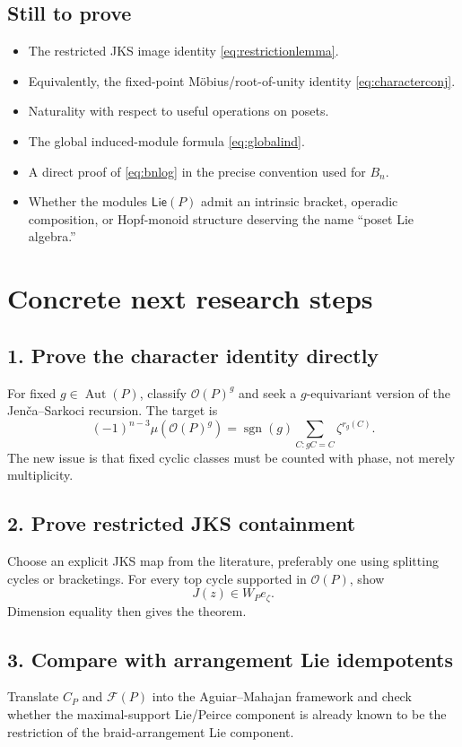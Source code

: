 \documentclass[11pt]{article}
\newcommand{\OP}{\mathcal O}
\newcommand{\Aut}{\operatorname{Aut}}
\newcommand{\sgn}{\operatorname{sgn}}
\begin{document}
\subsection*{Still to prove}
\begin{itemize}
\item The restricted JKS image identity \eqref{eq:restrictionlemma}.
\item Equivalently, the fixed-point M\"obius/root-of-unity identity
\eqref{eq:characterconj}.
\item Naturality with respect to useful operations on posets.
\item The global induced-module formula \eqref{eq:globalind}.
\item A direct proof of \eqref{eq:bnlog} in the precise convention used for
$B_n$.
\item Whether the modules $\mathsf{Lie}(P)$ admit an intrinsic bracket,
operadic composition, or Hopf-monoid structure deserving the name ``poset
Lie algebra.''
\end{itemize}

\section{Concrete next research steps}
\subsection{1. Prove the character identity directly}
For fixed $g\in\Aut(P)$, classify $\OP(P)^g$ and seek a $g$-equivariant
version of the Jen\v{c}a--Sarkoci recursion. The target is
\[
(-1)^{n-3}\mu(\OP(P)^g)=
\sgn(g)\sum_{C:gC=C}\zeta^{r_g(C)}.
\]
The new issue is that fixed cyclic classes must be counted with phase, not
merely multiplicity.

\subsection{2. Prove restricted JKS containment}
Choose an explicit JKS map from the literature, preferably one using
splitting cycles or bracketings. For every top cycle supported in $\OP(P)$,
show
\[
J(z)\in W_Pe_\zeta.
\]
Dimension equality then gives the theorem.

\subsection{3. Compare with arrangement Lie idempotents}
Translate $C_P$ and $\mathcal F(P)$ into the Aguiar--Mahajan framework and
check whether the maximal-support Lie/Peirce component is already known to
be the restriction of the braid-arrangement Lie component.
\end{document}
